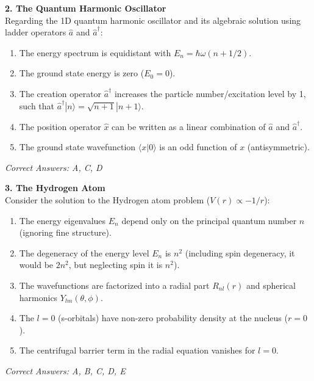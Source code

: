 \documentclass[a4paper,11pt]{article}
\begin{document}
\noindent\textbf{2. The Quantum Harmonic Oscillator}\\
Regarding the 1D quantum harmonic oscillator and its algebraic solution using ladder operators $\hat{a}$ and $\hat{a}^\dagger$:

\begin{enumerate}[label=\Alph*.]
    \item The energy spectrum is equidistant with $E_n = \hbar\omega(n + 1/2)$.
    \item The ground state energy is zero ($E_0 = 0$).
    \item The creation operator $\hat{a}^\dagger$ increases the particle number/excitation level by 1, such that $\hat{a}^\dagger |n\rangle = \sqrt{n+1} |n+1\rangle$.
    \item The position operator $\hat{x}$ can be written as a linear combination of $\hat{a}$ and $\hat{a}^\dagger$.
    \item The ground state wavefunction $\langle x | 0 \rangle$ is an odd function of $x$ (antisymmetric).
\end{enumerate}
\textit{Correct Answers: A, C, D}

\vspace{0.5cm}

\noindent\textbf{3. The Hydrogen Atom}\\
Consider the solution to the Hydrogen atom problem ($V(r) \propto -1/r$):

\begin{enumerate}[label=\Alph*.]
    \item The energy eigenvalues $E_n$ depend only on the principal quantum number $n$ (ignoring fine structure).
    \item The degeneracy of the energy level $E_n$ is $n^2$ (including spin degeneracy, it would be $2n^2$, but neglecting spin it is $n^2$).
    \item The wavefunctions are factorized into a radial part $R_{nl}(r)$ and spherical harmonics $Y_{lm}(\theta, \phi)$.
    \item The $l=0$ (s-orbitals) have non-zero probability density at the nucleus ($r=0$).
    \item The centrifugal barrier term in the radial equation vanishes for $l=0$.
\end{enumerate}
\textit{Correct Answers: A, B, C, D, E}

\vspace{0.5cm}
\end{document}
